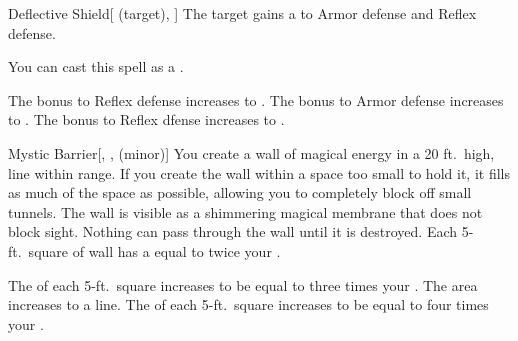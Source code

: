\lowercase{\hypertarget{spell:Deflective Shield}{}}\label{spell:Deflective Shield}
\begin{attuneability}[Rank 1]{\hypertarget{spell:Deflective Shield}{Deflective Shield}}[ (target), ]
The target gains a   to Armor defense and Reflex defense.

You can cast this spell as a .

\rankline
{} The bonus to Reflex defense increases to .
 The bonus to Armor defense increases to .
 The bonus to Reflex dfense increases to .
\end{attuneability}
\vspace{0.25em}



\lowercase{\hypertarget{spell:Mystic Barrier}{}}\label{spell:Mystic Barrier}
\begin{freeability}[Rank 1]{\hypertarget{spell:Mystic Barrier}{Mystic Barrier}}[, ,  (minor)]
\targetrule
You create a wall of magical energy in a 20 ft.\ high, \areamed line within \rngmed range.
If you create the wall within a space too small to hold it, it fills as much of the space as possible, allowing you to completely block off small tunnels.
The wall is visible as a shimmering magical membrane that does not block sight.
Nothing can pass through the wall until it is destroyed.
Each 5-ft.\ square of wall has a  equal to twice your .

\rankline
{} The  of each 5-ft.\ square increases to be equal to three times your .
 The area increases to a \arealarge line.
 The  of each 5-ft.\ square increases to be equal to four times your .
\end{freeability}
\vspace{0.25em}



